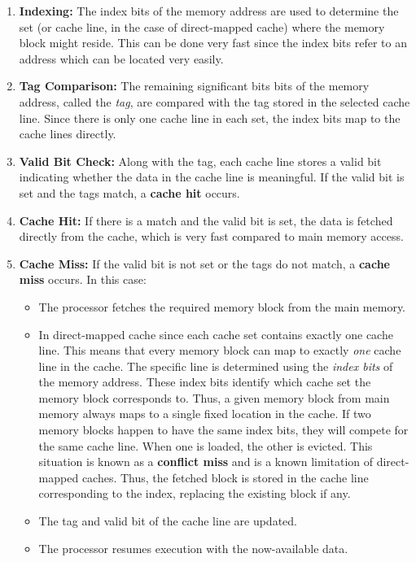 \documentclass[12pt]{book}
\begin{document}
\begin{enumerate}
    \item \textbf{Indexing:} The index bits of the memory address are used to determine the set (or cache line, in the case of direct-mapped cache) where the memory block might reside. This can be done very fast since the index bits refer to an address which can be located very easily.
    
    \item \textbf{Tag Comparison:} The remaining significant bits bits of the memory address, called the \emph{tag}, are compared with the tag stored in the selected cache line. Since there is only one cache line in each set, the index bits map to the cache lines directly.
    
    \item \textbf{Valid Bit Check:} Along with the tag, each cache line stores a valid bit indicating whether the data in the cache line is meaningful. If the valid bit is set and the tags match, a \textbf{cache hit} occurs.
    
    \item \textbf{Cache Hit:} If there is a match and the valid bit is set, the data is fetched directly from the cache, which is very fast compared to main memory access.
    
    \item \textbf{Cache Miss:} If the valid bit is not set or the tags do not match, a \textbf{cache miss} occurs. In this case:
    \begin{itemize}
        \item The processor fetches the required memory block from the main memory.
        \item In direct-mapped cache since each cache set contains exactly one cache line. This means that every memory block can map to exactly \emph{one} cache line in the cache. The specific line is determined using the \emph{index bits} of the memory address. These index bits identify which cache set the memory block corresponds to. Thus, a given memory block from main memory always maps to a single fixed location in the cache. If two memory blocks happen to have the same index bits, they will compete for the same cache line. When one is loaded, the other is evicted. This situation is known as a \textbf{conflict miss} and is a known limitation of direct-mapped caches. Thus, the fetched block is stored in the cache line corresponding to the index, replacing the existing block if any.
        \item The tag and valid bit of the cache line are updated.
        \item The processor resumes execution with the now-available data.
    \end{itemize}
    
\end{enumerate}
\end{document}
